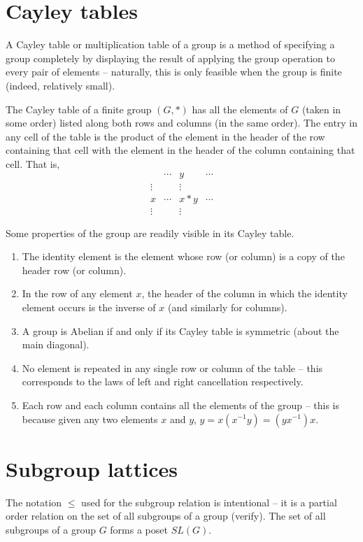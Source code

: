 \documentclass[svgnames]{article}
\theoremstyle{definition}
\theoremstyle{remark}
\newcommand{\newterm}[1]{{\color{alertcolor} #1}}
\begin{document}
\begin{appendices}
\section{Cayley tables}\label{sec:CayleyTables}
A \newterm{Cayley table} or \newterm{multiplication table} of a group is a method of specifying a group completely by displaying the result of applying the group operation to every pair of elements -- naturally, this is only feasible when the group is finite (indeed, relatively small).

The Cayley table of a finite group $(G, *)$ has all the elements of $G$ (taken in some order) listed along both rows and columns (in the same order). The entry in any cell of the table is the product of the element in the header of the row containing that cell with the element in the header of the column containing that cell. That is,
\begin{equation*}
\begin{array}{r|ccc}
		&	\cdots	&	y	&	\cdots\\
\hline
\vdots	&			&	\vdots	&		\\
x		&	\cdots	&	x*y		&	\cdots\\
\vdots	&			&	\vdots	&	
\end{array}
\end{equation*}

Some properties of the group are readily visible in its Cayley table.
\begin{enumerate}
\item The identity element is the element whose row (or column) is a copy of the header row (or column).
\item In the row of any element $x$, the header of the column in which the identity element occurs is the inverse of $x$ (and similarly for columns).
\item A group is Abelian if and only if its Cayley table is symmetric (about the main diagonal).
\item No element is repeated in any single row or column of the table -- this corresponds to the laws of left and right cancellation respectively.
\item Each row and each column contains all the elements of the group -- this is because given any two elements $x$ and $y$, $y = x(x^{-1}y) = (yx^{-1})x$.
\end{enumerate}

\section{Subgroup lattices}\label{def:SL(G)}
The notation $\le$ used for the subgroup relation is intentional -- it is a partial order relation on the set of all subgroups of a group {\small (verify)}. The set of all subgroups of a group $G$ forms a poset $SL(G)$.


\end{appendices}
\end{document}
